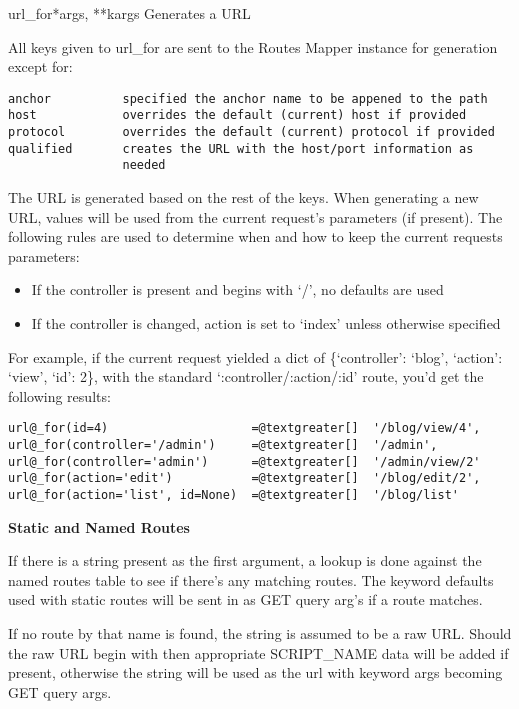 \documentclass[letterpaper,10pt,english]{manual}
\begin{document}
\hypertarget{routes.url_for}{}\begin{funcdesc}{url\_for}{*args, **kargs}
Generates a URL

All keys given to url\_for are sent to the Routes Mapper instance for 
generation except for:

\begin{Verbatim}[commandchars=@\[\]]
anchor          specified the anchor name to be appened to the path
host            overrides the default (current) host if provided
protocol        overrides the default (current) protocol if provided
qualified       creates the URL with the host/port information as 
                needed
\end{Verbatim}

The URL is generated based on the rest of the keys. When generating a new 
URL, values will be used from the current request's parameters (if 
present). The following rules are used to determine when and how to keep 
the current requests parameters:
\begin{itemize}
\item {} 
If the controller is present and begins with `/', no defaults are used

\item {} 
If the controller is changed, action is set to `index' unless otherwise 
specified

\end{itemize}

For example, if the current request yielded a dict of
\{`controller': `blog', `action': `view', `id': 2\}, with the standard 
`:controller/:action/:id' route, you'd get the following results:

\begin{Verbatim}[commandchars=@\[\]]
url@_for(id=4)                    =@textgreater[]  '/blog/view/4',
url@_for(controller='/admin')     =@textgreater[]  '/admin',
url@_for(controller='admin')      =@textgreater[]  '/admin/view/2'
url@_for(action='edit')           =@textgreater[]  '/blog/edit/2',
url@_for(action='list', id=None)  =@textgreater[]  '/blog/list'
\end{Verbatim}

\textbf{Static and Named Routes}

If there is a string present as the first argument, a lookup is done 
against the named routes table to see if there's any matching routes. The
keyword defaults used with static routes will be sent in as GET query 
arg's if a route matches.

If no route by that name is found, the string is assumed to be a raw URL. 
Should the raw URL begin with \code{/} then appropriate SCRIPT\_NAME data will
be added if present, otherwise the string will be used as the url with 
keyword args becoming GET query args.
\end{funcdesc}
\end{document}
